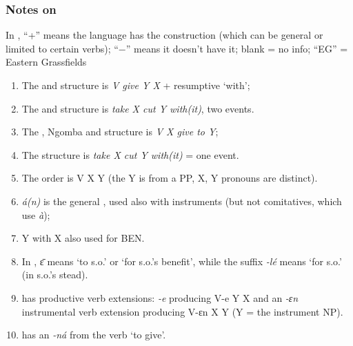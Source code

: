 \documentclass[output=paper]{langsci/langscibook}
\begin{document}
\subsubsection*{Notes on }
\begin{small}
In , ``+'' means the language has the construction (which can be general or limited to certain verbs); ``−'' means it doesn’t have it; blank = no info; ``EG'' = Eastern Grassfields

\begin{enumerate}[label=(\arabic*)]
	\item The  and  structure is \textit{V give Y X} + resumptive ‘with’; 
	\item The  and  structure is \textit{take X cut Y with(it)}, two events. 
	\item The , Ngomba and  structure is \textit{V X give to Y}; 
	\item The  structure is \textit{take X cut Y with(it)} = one event. 
	\item The  order is V X Y (the Y is from a PP, X, Y pronouns are distinct). 
	\item {} \textit{á(n)} is the general  , used also with instruments (but not comitatives, which use \textit{à}); 
	\item {} Y with X also used for BEN. 
	\item In , \=ɛ  means ‘to s.o.’ or ‘for s.o.’s benefit’, while the  suffix \textit{-lé} means ‘for s.o.’ (in s.o.’s stead). 
	\item {} has productive verb extensions:  \textit{-e} producing V-e Y X and an \textit{-ɛn} instrumental verb extension producing V-ɛn X Y (Y = the instrument NP). 
	\item {} has an  \textit{-ná} from the verb ‘to give’.
\end{enumerate}
\end{small}
\end{document}
